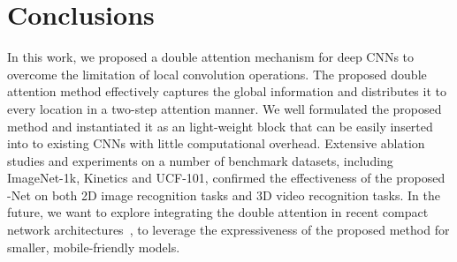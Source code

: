 \documentclass{article}
\begin{document}
\begin{table}[t]
\setlength{\tabcolsep}{10pt}
\centering
\caption{Comparisons with state-of-the-arts results on UCF-101. The averaged Top-1 video accuracy on three train/test splits is reported.}
\label{tab:ucf-hmdb_sota}
\end{table}






 
\section{Conclusions}
\label{sec:conclusions}
In this work, we proposed a double attention mechanism for deep CNNs to overcome the limitation of local convolution operations. The proposed double attention method effectively captures the global information  and distributes it to every location in a two-step attention manner. We well formulated   the proposed method and instantiated it as an light-weight block that can be easily inserted into to existing CNNs with little computational overhead. Extensive ablation studies and experiments on a number of benchmark datasets, including ImageNet-1k, Kinetics and UCF-101, confirmed the effectiveness of the proposed -Net on both 2D image recognition tasks and 3D video recognition tasks. In the future, we want to explore integrating the double attention in recent compact network architectures~\cite{sandler2018inverted, ma2018shufflenet, chen2018multifiber}, to leverage the expressiveness of the proposed method for smaller, mobile-friendly models.
 




\end{document}
